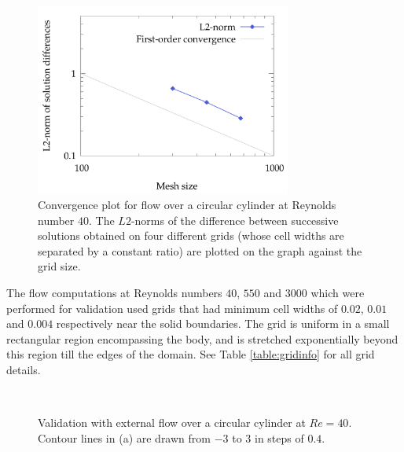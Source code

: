 \documentclass{tufte-handout}
\begin{document}
\begin{figure}
\centering
	\includegraphics[width=0.75\textwidth]{figs/cylRe40Convergence.pdf}
	\caption{Convergence plot for flow over a circular cylinder at Reynolds number $40$. The $L2$-norms of the difference between successive solutions obtained on four different grids (whose cell widths are separated by a constant ratio) are plotted on the graph against the grid size.}
	\label{cylRe40convergence}
\end{figure}

The flow computations at Reynolds numbers $40$, $550$ and $3000$ which were performed for validation used grids that had minimum cell widths of $0.02$, $0.01$ and $0.004$ respectively near the solid boundaries. The grid is uniform in a small rectangular region encompassing the body, and is stretched exponentially beyond this region till the edges of the domain. See Table \ref{table:gridinfo} for all grid details.
	

\begin{figure}[h]
	\vspace{0.4cm}\\
\caption {Validation with external flow over a circular cylinder at $Re=40$. Contour lines in (a) are drawn from $-3$ to $3$ in steps of $0.4$.}
	\label{fig:Re40}
\end{figure}
\end{document}
